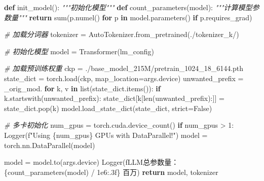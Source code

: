 \documentclass[
]{article}
\newenvironment{Shaded}{}{}
\newcommand{\BuiltInTok}[1]{\textcolor[rgb]{0.00,0.50,0.00}{#1}}
\newcommand{\CommentTok}[1]{\textcolor[rgb]{0.38,0.63,0.69}{\textit{#1}}}
\newcommand{\ControlFlowTok}[1]{\textcolor[rgb]{0.00,0.44,0.13}{\textbf{#1}}}
\newcommand{\DecValTok}[1]{\textcolor[rgb]{0.25,0.63,0.44}{#1}}
\newcommand{\FloatTok}[1]{\textcolor[rgb]{0.25,0.63,0.44}{#1}}
\newcommand{\KeywordTok}[1]{\textcolor[rgb]{0.00,0.44,0.13}{\textbf{#1}}}
\newcommand{\NormalTok}[1]{#1}
\newcommand{\OperatorTok}[1]{\textcolor[rgb]{0.40,0.40,0.40}{#1}}
\newcommand{\SpecialCharTok}[1]{\textcolor[rgb]{0.25,0.44,0.63}{#1}}
\newcommand{\SpecialStringTok}[1]{\textcolor[rgb]{0.73,0.40,0.53}{#1}}
\newcommand{\StringTok}[1]{\textcolor[rgb]{0.25,0.44,0.63}{#1}}
\newcommand{\VariableTok}[1]{\textcolor[rgb]{0.10,0.09,0.49}{#1}}
\begin{document}
\begin{Shaded}
\begin{Highlighting}[]
\KeywordTok{def}\NormalTok{ init\_model():}
    \CommentTok{"""初始化模型"""}
    \KeywordTok{def}\NormalTok{ count\_parameters(model):}
        \CommentTok{"""计算模型参数量"""}
        \ControlFlowTok{return} \BuiltInTok{sum}\NormalTok{(p.numel() }\ControlFlowTok{for}\NormalTok{ p }\KeywordTok{in}\NormalTok{ model.parameters() }\ControlFlowTok{if}\NormalTok{ p.requires\_grad)}

    \CommentTok{\# 加载分词器}
\NormalTok{    tokenizer }\OperatorTok{=}\NormalTok{ AutoTokenizer.from\_pretrained(}\StringTok{\textquotesingle{}./tokenizer\_k/\textquotesingle{}}\NormalTok{)}

    \CommentTok{\# 初始化模型}
\NormalTok{    model }\OperatorTok{=}\NormalTok{ Transformer(lm\_config)}

    \CommentTok{\# 加载预训练权重}
\NormalTok{    ckp }\OperatorTok{=} \StringTok{\textquotesingle{}./base\_model\_215M/pretrain\_1024\_18\_6144.pth\textquotesingle{}}
\NormalTok{    state\_dict }\OperatorTok{=}\NormalTok{ torch.load(ckp, map\_location}\OperatorTok{=}\NormalTok{args.device)}
\NormalTok{    unwanted\_prefix }\OperatorTok{=} \StringTok{\textquotesingle{}\_orig\_mod.\textquotesingle{}}
    \ControlFlowTok{for}\NormalTok{ k, v }\KeywordTok{in} \BuiltInTok{list}\NormalTok{(state\_dict.items()):}
        \ControlFlowTok{if}\NormalTok{ k.startswith(unwanted\_prefix):}
\NormalTok{            state\_dict[k[}\BuiltInTok{len}\NormalTok{(unwanted\_prefix):]] }\OperatorTok{=}\NormalTok{ state\_dict.pop(k)}
\NormalTok{    model.load\_state\_dict(state\_dict, strict}\OperatorTok{=}\VariableTok{False}\NormalTok{)}
    
    \CommentTok{\# 多卡初始化}
\NormalTok{    num\_gpus }\OperatorTok{=}\NormalTok{ torch.cuda.device\_count()}
    \ControlFlowTok{if}\NormalTok{ num\_gpus }\OperatorTok{\textgreater{}} \DecValTok{1}\NormalTok{:}
\NormalTok{        Logger(}\SpecialStringTok{f"Using }\SpecialCharTok{\{}\NormalTok{num\_gpus}\SpecialCharTok{\}}\SpecialStringTok{ GPUs with DataParallel!"}\NormalTok{)}
\NormalTok{        model }\OperatorTok{=}\NormalTok{ torch.nn.DataParallel(model)}
    
\NormalTok{    model }\OperatorTok{=}\NormalTok{ model.to(args.device)}
\NormalTok{    Logger(}\SpecialStringTok{f\textquotesingle{}LLM总参数量：}\SpecialCharTok{\{}\NormalTok{count\_parameters(model) }\OperatorTok{/} \FloatTok{1e6}\SpecialCharTok{:.3f\}}\SpecialStringTok{ 百万\textquotesingle{}}\NormalTok{)}
    \ControlFlowTok{return}\NormalTok{ model, tokenizer}



\end{Highlighting}
\end{Shaded}
\end{document}
